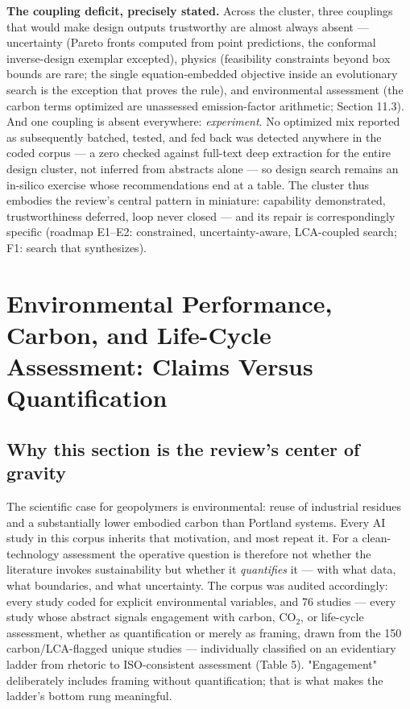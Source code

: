 \documentclass[pdflatex,sn-basic]{sn-jnl}
\begin{document}
\textbf{The coupling deficit, precisely stated.} Across the cluster, three couplings that would make design outputs trustworthy are almost always absent --- uncertainty (Pareto fronts computed from point predictions, the conformal inverse-design exemplar \citep{jagad2026} excepted), physics (feasibility constraints beyond box bounds are rare; the single equation-embedded objective inside an evolutionary search \citep{guo2026} is the exception that proves the rule), and environmental assessment (the carbon terms optimized are unassessed emission-factor arithmetic; Section 11.3). And one coupling is absent everywhere: \emph{experiment}. No optimized mix reported as subsequently batched, tested, and fed back was detected anywhere in the coded corpus --- a zero checked against full-text deep extraction for the entire design cluster, not inferred from abstracts alone --- so design search remains an in-silico exercise whose recommendations end at a table. The cluster thus embodies the review's central pattern in miniature: capability demonstrated, trustworthiness deferred, loop never closed --- and its repair is correspondingly specific (roadmap E1--E2: constrained, uncertainty-aware, LCA-coupled search; F1: search that synthesizes).

\section{Environmental Performance, Carbon, and Life-Cycle Assessment: Claims Versus Quantification}

\subsection{Why this section is the review's center of gravity}

The scientific case for geopolymers is environmental: reuse of industrial residues and a substantially lower embodied carbon than Portland systems. Every AI study in this corpus inherits that motivation, and most repeat it. For a clean-technology assessment the operative question is therefore not whether the literature invokes sustainability but whether it \emph{quantifies} it --- with what data, what boundaries, and what uncertainty. The corpus was audited accordingly: every study coded for explicit environmental variables, and 76 studies --- every study whose abstract signals engagement with carbon, CO$_2$, or life-cycle assessment, whether as quantification or merely as framing, drawn from the 150 carbon/LCA-flagged unique studies --- individually classified on an evidentiary ladder from rhetoric to ISO-consistent assessment (Table 5). "Engagement" deliberately includes framing without quantification; that is what makes the ladder's bottom rung meaningful.
\end{document}
